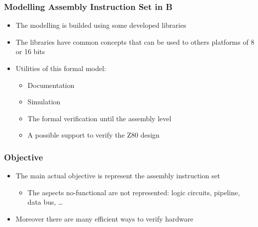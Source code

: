 \begin{frame}
\frametitle{Modelling Assembly Instruction Set in B}  

\begin{itemize}[<+->]
  \item The modelling is builded using some developed libraries
  \item The libraries have common concepts that can be used to others platforms of 8 or 16 bits
  \item Utilities of this formal model:
  \begin{itemize}
    \item Documentation
    \item Simulation
    \item The formal verification until the assembly level
    \item A possible support to verify the Z80 design

  \end{itemize}
\end{itemize}

\end{frame}



\begin{frame}
\frametitle{Objective}  

\begin{itemize}[<+->]
  \item The main actual objective is represent the assembly instruction set
    \begin{itemize}
    \item The aspects no-functional are not represented: logic circuits, pipeline, data bus, \ldots 
  \end{itemize}
  \item Moreover there are many efficient ways to verify hardware

\end{itemize}
% 

\end{frame}




